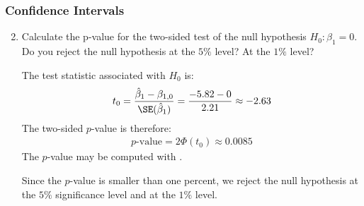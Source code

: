 \begin{frame}
\frametitle{Confidence Intervals}
\ask
\begin{enumerate}\setcounter{enumi}{1}

\item Calculate the p-value for the two-sided test of the null hypothesis
$H_0\colon \beta_1 = 0$. Do you reject the null hypothesis at the $5\%$ level? At the $1\%$ level?

\begin{answer}
The test statistic associated with $H_{0}$ is:
\begin{align*}
t_{0} 
    = \frac{\hat{\beta}_{1}-\beta_{1,0}}{\SE(\hat{\beta}_{1})}
    = \frac{-5.82-0}{2.21}
    \approx -2.63
\end{align*} 
The two-sided $p$-value is therefore:
\begin{align*}
p\text{-value} 
    = 2 \Phi(t_{0})
    \approx 0.0085
\end{align*} 
The $p$-value may be computed with .

Since the $p$-value is smaller than one percent, we reject the null hypothesis at the $5\%$ significance level and at the $1\%$ level.
\end{answer}

\end{enumerate}
\end{frame}


